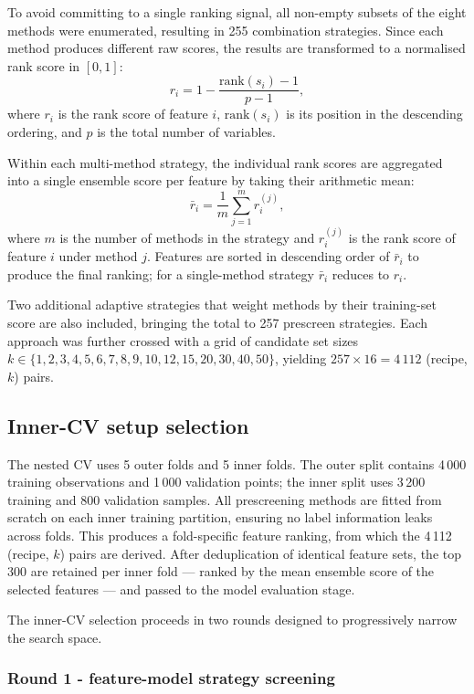 \documentclass[cameraready]{Interspeech}
\begin{document}
To avoid committing to a single ranking signal, all non-empty subsets of the eight methods
were enumerated, resulting in 255 combination strategies. Since each method produces
different raw scores, the results are transformed to a normalised rank score in $[0,1]$:
\[
r_i = 1 - \frac{\text{rank}(s_i) - 1}{p - 1},
\]
where $r_i$ is the rank score of feature $i$, $\text{rank}(s_i)$ is its position in the
descending ordering, and $p$ is the total number of variables.

Within each multi-method strategy, the individual rank scores are aggregated into a single
ensemble score per feature by taking their arithmetic mean:
\[
\bar{r}_i = \frac{1}{m} \sum_{j=1}^{m} r_i^{(j)},
\]
where $m$ is the number of methods in the strategy and $r_i^{(j)}$ is the rank score of
feature $i$ under method $j$. Features are sorted in descending order of $\bar{r}_i$ to
produce the final ranking; for a single-method strategy $\bar{r}_i$ reduces to $r_i$.

Two additional adaptive strategies that weight methods by their training-set score are also
included, bringing the total to 257 prescreen strategies.
Each approach was further crossed with a grid of candidate set sizes
$k \in \{1, 2, 3, 4, 5, 6, 7, 8, 9, 10, 12, 15, 20, 30, 40, 50\}$,
yielding $257 \times 16 = 4\,112$ (recipe, $k$) pairs.

\subsection{Inner-CV setup selection}
\label{sec:inner}

The nested CV uses 5 outer folds and 5 inner folds. The outer split contains 4\,000 training
observations and 1\,000 validation points; the inner split uses 3\,200 training and 800
validation samples.
All prescreening methods are fitted from scratch on each inner training partition, ensuring
no label information leaks across folds.
This produces a fold-specific feature ranking, from which the 4\,112 (recipe, $k$) pairs
are derived. After deduplication of identical feature sets, the top 300 are retained per
inner fold --- ranked by the mean ensemble score of the selected features --- and passed to
the model evaluation stage.

The inner-CV selection proceeds in two rounds designed to progressively narrow the search space.

\subsubsection{Round 1 - feature-model strategy screening}
\end{document}
